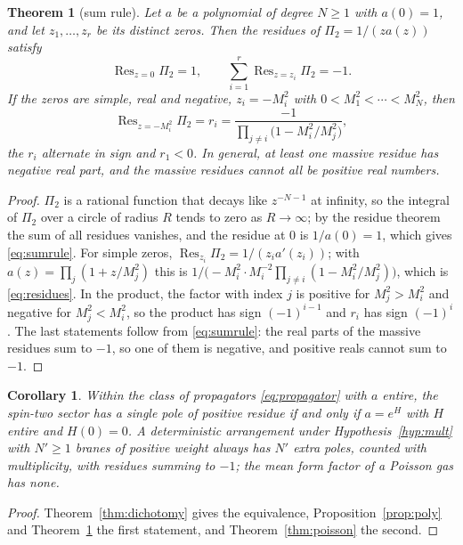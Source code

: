 \documentclass[aps,prd,10pt,twocolumn,superscriptaddress,nofootinbib,floatfix,longbibliography,showpacs,showkeys]{revtex4-2}
\theoremstyle{plain}
\newtheorem{theorem}{Theorem}
\newtheorem{corollary}{Corollary}
\theoremstyle{definition}
\theoremstyle{remark}
\newcommand{\Res}{\operatorname{Res}}
\begin{document}
\begin{theorem}[sum rule]
\label{thm:sumrule}
Let $a$ be a polynomial of degree $N\ge1$ with $a(0)=1$, and let $z_1,\dots,z_r$ be its distinct zeros. Then the residues of $\Pi_2=1/(za(z))$ satisfy
\begin{equation}
\label{eq:sumrule}
\Res_{z=0}\Pi_2=1,\qquad \sum_{i=1}^{r}\Res_{z=z_i}\Pi_2=-1 .
\end{equation}
If the zeros are simple, real and negative, $z_i=-M_i^2$ with $0<M_1^2<\cdots<M_N^2$, then
\begin{equation}
\label{eq:residues}
\Res_{z=-M_i^2}\Pi_2=r_i=\frac{-1}{\prod_{j\neq i}\bigl(1-M_i^2/M_j^2\bigr)},
\end{equation}
the $r_i$ alternate in sign and $r_1<0$. In general, at least one massive residue has negative real part, and the massive residues cannot all be positive real numbers.
\end{theorem}

\begin{proof}
$\Pi_2$ is a rational function that decays like $z^{-N-1}$ at infinity, so the integral of $\Pi_2$ over a circle of radius $R$ tends to zero as $R\to\infty$; by the residue theorem the sum of all residues vanishes, and the residue at $0$ is $1/a(0)=1$, which gives \eqref{eq:sumrule}. For simple zeros, $\Res_{z_i}\Pi_2=1/(z_ia'(z_i))$; with $a(z)=\prod_j(1+z/M_j^2)$ this is $1/\bigl(-M_i^2\cdot M_i^{-2}\prod_{j\ne i}(1-M_i^2/M_j^2)\bigr)$, which is \eqref{eq:residues}. In the product, the factor with index $j$ is positive for $M_j^2>M_i^2$ and negative for $M_j^2<M_i^2$, so the product has sign $(-1)^{i-1}$ and $r_i$ has sign $(-1)^i$. The last statements follow from \eqref{eq:sumrule}: the real parts of the massive residues sum to $-1$, so one of them is negative, and positive reals cannot sum to $-1$.
\end{proof}

\begin{corollary}
\label{cor:ghostfree}
Within the class of propagators \eqref{eq:propagator} with $a$ entire, the spin-two sector has a single pole of positive residue if and only if $a=e^{H}$ with $H$ entire and $H(0)=0$. A deterministic arrangement under Hypothesis~\ref{hyp:mult} with $N'\ge1$ branes of positive weight always has $N'$ extra poles, counted with multiplicity, with residues summing to $-1$; the mean form factor of a Poisson gas has none.
\end{corollary}

\begin{proof}
Theorem~\ref{thm:dichotomy} gives the equivalence, Proposition~\ref{prop:poly} and Theorem~\ref{thm:sumrule} the first statement, and Theorem~\ref{thm:poisson} the second.
\end{proof}
\end{document}
